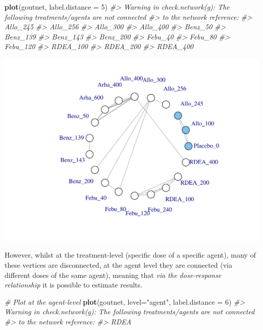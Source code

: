 \documentclass[]{article}
\newenvironment{Shaded}{\begin{snugshade}}{\end{snugshade}}
\newcommand{\CommentTok}[1]{\textcolor[rgb]{0.56,0.35,0.01}{\textit{#1}}}
\newcommand{\DataTypeTok}[1]{\textcolor[rgb]{0.13,0.29,0.53}{#1}}
\newcommand{\DecValTok}[1]{\textcolor[rgb]{0.00,0.00,0.81}{#1}}
\newcommand{\KeywordTok}[1]{\textcolor[rgb]{0.13,0.29,0.53}{\textbf{#1}}}
\newcommand{\NormalTok}[1]{#1}
\newcommand{\StringTok}[1]{\textcolor[rgb]{0.31,0.60,0.02}{#1}}
\begin{document}
\begin{Shaded}
\begin{Highlighting}[]
\KeywordTok{plot}\NormalTok{(goutnet, }\DataTypeTok{label.distance =} \DecValTok{5}\NormalTok{)}
\CommentTok{#> Warning in check.network(g): The following treatments/agents are not connected}
\CommentTok{#> to the network reference:}
\CommentTok{#> Allo_245}
\CommentTok{#> Allo_256}
\CommentTok{#> Allo_300}
\CommentTok{#> Allo_400}
\CommentTok{#> Benz_50}
\CommentTok{#> Benz_139}
\CommentTok{#> Benz_143}
\CommentTok{#> Benz_200}
\CommentTok{#> Febu_40}
\CommentTok{#> Febu_80}
\CommentTok{#> Febu_120}
\CommentTok{#> RDEA_100}
\CommentTok{#> RDEA_200}
\CommentTok{#> RDEA_400}
\end{Highlighting}
\end{Shaded}

\includegraphics{mbnmadose_files/figure-latex/unnamed-chunk-8-1.pdf}

However, whilst at the treatment-level (specific dose of a specific
agent), many of these vertices are disconnected, at the agent level they
are connected (via different doses of the same agent), meaning that
\emph{via the dose-response relationship} it is possible to estimate
results.

\begin{Shaded}
\begin{Highlighting}[]
\CommentTok{# Plot at the agent-level}
\KeywordTok{plot}\NormalTok{(goutnet, }\DataTypeTok{level=}\StringTok{"agent"}\NormalTok{, }\DataTypeTok{label.distance =} \DecValTok{6}\NormalTok{)}
\CommentTok{#> Warning in check.network(g): The following treatments/agents are not connected}
\CommentTok{#> to the network reference:}
\CommentTok{#> RDEA}
\end{Highlighting}
\end{Shaded}
\end{document}
